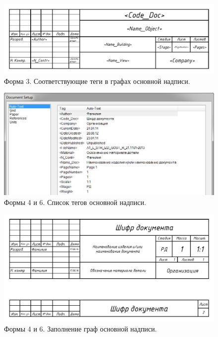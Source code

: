 \documentclass[14pt]{extreport}
\begin{document}
\begin{figure}[h]
	\centering
	\includegraphics[width=\textwidth]{SPDS_OSN_DOC_with_tagname}
    \caption{Форма 3. Соответствующие теги в графах основной надписи.\label{SPDS_OSN_DOC_with_tagname}}
\end{figure}

\begin{figure}[h]
	\centering
	\includegraphics[width=\textwidth]{SPDS_STR_IZD}
    \caption{Формы 4 и 6. Список тегов основной надписи.\label{SPDS_STR_IZD}}
\end{figure}

\begin{figure}[h]
	\centering
	\includegraphics[width=\textwidth]{SPDS_STR_IZD_without_tagname}
    \caption{Формы 4 и 6. Заполнение граф основной надписи.\label{SPDS_STR_IZD_without_tagname}}
\end{figure}
\end{document}
